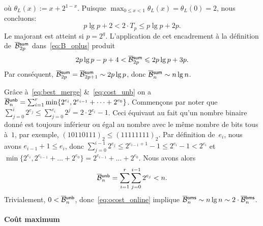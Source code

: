 où \(\theta_L(x) := x + 2^{1 - x}\). Puisque \(\max_{0 \leqslant x <
  1}\theta_L(x) = \theta_L(0) = 2\), nous concluons:
\begin{equation*}
p\lg p + 2 < 2 \cdot T_p \leqslant p\lg p + 2p.
\end{equation*}
Le majorant est atteint si \(p=2^q\). L'application de cet encadrement
à la définition de~\(\OB{\fun{sum}}{2p}\) dans~\eqref{eq:B_oplus}
produit
\begin{equation}
2p\lg p - p + 4 < \OB{\fun{sum}}{2p} \leqslant 2p\lg p + 3p.
\label{ineq:B_oplus_2p}
\end{equation}
Par conséquent, \(\OB{\fun{sum}}{2p} = \OB{\fun{sum}}{2p+1} \sim 2p\lg
p\), donc \(\OB{\fun{sum}}{n} \sim n\lg
n\).

\bigskip

\noindent Grâce à~\eqref{eq:best_merge} \&~\eqref{eq:cost_unb} on a
\(\OB{\fun{unb}}{n} = \sum_{i=1}^{r}{\min\{2^{e_i},2^{e_{i-1}} + \dots
  + 2^{e_0}\}}\). Commençons par
noter que \(\sum_{j=0}^{i}{2^{e_j}} \leqslant \sum_{j=0}^{e_i}{2^j} =
2 \cdot 2^{e_i} - 1\). Ceci équivaut au fait qu'un nombre binaire
donné est toujours inférieur ou égal au nombre avec le même nombre de
bits tous à~\(1\), par exemple, \((10110111)_2 \leqslant
(11111111)_2\). Par définition de~\(e_i\), nous avons \(e_{i-1} + 1
\leqslant e_i\), donc \(\sum_{j=0}^{i-1}{2^{e_j}} \leqslant
2^{e_{i-1}+1} - 1 \leqslant 2^{e_i} - 1 < 2^{e_i}\) et
\(\min\{2^{e_i},2^{e_{i-1}} + \dots + 2^{e_0}\} = 2^{e_{i-1}} + \dots
+ 2^{e_0}\). Nous avons alors
\begin{equation}
\OB{\fun{unb}}{n} = \sum_{i=1}^{r}\sum_{j=0}^{i-1}{2^{e_j}} < n.
\label{ineq:OBunb}
\end{equation}
Trivialement, \(0 < \OB{\fun{unb}}{n}\), donc~\eqref{eq:ocost_online}
implique \(\OB{\fun{oms}}{n} \sim n\lg n \sim 2
\cdot \OB{\fun{bms}}{n}\).   

\paragraph{Coût maximum}

